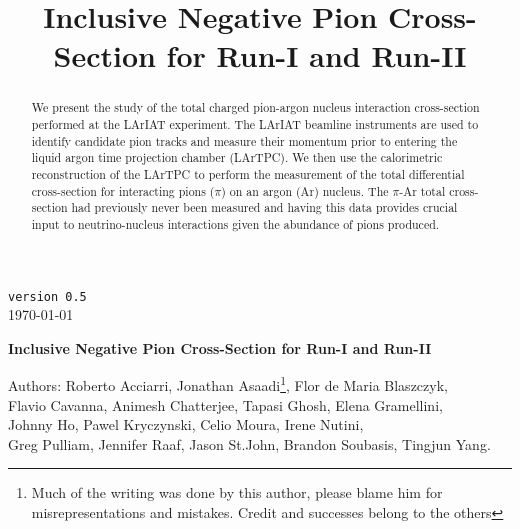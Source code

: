 \documentclass[a4paper]{article}
\title{Inclusive Negative Pion Cross-Section for Run-I and Run-II}
\begin{document}
\def\Journal#1#2#3#4{{#1} {\bf #2}, #3 (#4)}
\def\etal{{\it et\ al.}}
\def\numunue{\nu_\mu\rightarrow\nu_e}
\def\numunutau{\nu_\mu\rightarrow\nu_\tau}
\def\nuebar{\bar\nu_e}
\def\nue{\nu_e}
\def\nutau{\nu_\tau}
\def\numubar{\bar\nu_\mu}
\def\numu{\nu_\mu}
\def\ra{\rightarrow}
\def\numubarnuebar{\bar\nu_\mu\rightarrow\bar\nu_e}
\def\nuebarnumubar{\bar\nu_e\rightarrow\bar\nu_\mu}
\def\osc{\rightsquigarrow}
\def\inteni{{\cal I}_{pot}}
\def\fmerit{{\cal F}}
\begin{flushright}
{\tt version 0.5}\\ 
\today
\end{flushright}
\vspace*{0.6cm}
\begin{center}
{\Large \bf Inclusive Negative Pion Cross-Section for Run-I and Run-II} 
\vspace*{1.6cm}
\setcounter{footnote}{0}  
\def\A{\kern+.6ex\lower.42ex\hbox{$\scriptstyle \iota$}\kern-1.20ex a}
\def\E{\kern+.5ex\lower.42ex\hbox{$\scriptstyle \iota$}\kern-1.10ex e}
\small
\newcommand{\Aname}[2]{#1}
\def\titlefoot#1{\vspace{-0.3cm}\begin{center}{\bf #1}\end{center}}

Authors: Roberto Acciarri, Jonathan Asaadi\footnote{Much of the writing was done by this author, please blame him for misrepresentations and mistakes. Credit and successes belong to the others}, Flor de Maria Blaszczyk, \\ 
Flavio Cavanna, Animesh Chatterjee, Tapasi Ghosh, Elena Gramellini,\\ 
 Johnny Ho, Pawel Kryczynski, Celio Moura, Irene Nutini, \\
Greg Pulliam, Jennifer Raaf, Jason St.John, Brandon Soubasis, Tingjun Yang. \\

\end{center}
\vspace*{1cm}


\begin{abstract}

We present the study of the total charged pion-argon nucleus interaction cross-section performed at the LArIAT experiment. The LArIAT beamline instruments are used to identify candidate pion tracks and measure their momentum prior to entering the liquid argon time projection chamber (LArTPC). We then use the calorimetric reconstruction of the LArTPC to perform the measurement of the total differential cross-section for interacting pions ($\pi$) on an argon (Ar) nucleus. The $\pi$-Ar total cross-section had previously never been measured and having this data provides crucial input to neutrino-nucleus interactions given the abundance of pions produced. 

\end{abstract} 
\end{document}
